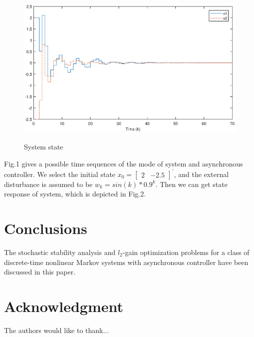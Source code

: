 \documentclass[conference]{IEEEtran}
\begin{document}
\begin{figure}[!htb]
	\centering\includegraphics[scale=0.4]{./simulink/state.eps}\\
	\caption{System state}
	\label{fig.2}
\end{figure}

Fig.1 gives a possible time sequences of the mode of system and asynchronous controller. We select the initial state $x_{0}=\begin{bmatrix}
	2&-2.5
\end{bmatrix}^{'}$, and the external disturbance is assumed to be $w_{k} = sin(k)*0.9^{k}$. Then we can get state response of system, which is depicted in Fig.2.




\section{Conclusions}
The stochastic stability analysis and $l_{2}$-gain optimization problems for a class of discrete-time nonlinear Markov systems with asynchronous controller have been discussed in this paper. 


\section*{Acknowledgment}


The authors would like to thank...






\end{document}
